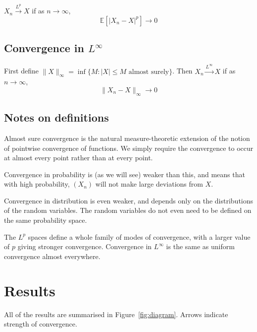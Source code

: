 \documentclass{article}
\begin{document}
$X_n \xrightarrow{L^p} X$
if as $n \to \infty$,
$$\mathbb{E}[|X_n - X|^p] \to 0$$

\subsection*{Convergence in $L^\infty$}

First define $\|X\|_\infty = \inf\{M: |X| \leq M \text{ almost surely}\}$.
Then $X_n \xrightarrow{L^\infty} X$
if as $n \to \infty$,
$$\|X_n - X\|_\infty \to 0$$

\subsection*{Notes on definitions}

Almost sure convergence is the natural measure-theoretic extension of the
notion of pointwise convergence of functions.
We simply require the convergence to occur at almost every point rather
than at every point.

Convergence in probability is (as we will see) weaker than this, and means that
with high probability, $(X_n)$ will not make large deviations from $X$.

Convergence in distribution is even weaker, and depends only on the
distributions of the random variables.
The random variables do not even need to be defined on the same probability space.

The $L^p$ spaces define a whole family of modes of convergence, with a larger value of $p$ giving
stronger convergence.
Convergence in $L^\infty$ is the same as uniform convergence almost everywhere.


\section{Results}

All of the results are summarised in Figure~\ref{fig:diagram}.
Arrows indicate strength of convergence.
\end{document}
